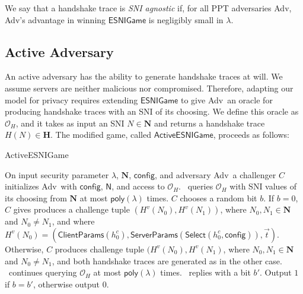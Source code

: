 \documentclass{article}
\newcommand{\adv}{{\sf Adv}}
\begin{document}
We say that a handshake trace is \emph{SNI agnostic} if, for all PPT adversaries \adv, \adv's advantage in 
winning $\mathsf{ESNIGame}$ is negligibly small in $\lambda$. 


\subsection{Active Adversary}

An active adversary has the ability to generate handshake traces at will. We assume servers are neither malicious nor compromised. 
Therefore, adapting our model for privacy requires extending $\mathsf{ESNIGame}$ to give \adv\ an oracle for producing handshake
traces with an SNI of its choosing. We define this oracle as $\mathcal{O}_H$, and it takes as input an SNI $N \in \mathbf{N}$
and returns a handshake trace $H(N) \in \mathbf{H}$. The modified game, called $\mathsf{ActiveESNIGame}$, proceeds as follows:

\begin{algorithm}
\caption{{\sf ActiveESNIGame}} 
\label{alg:active-esnigame}
\begin{algorithmic}[1]
  \STATE On input security parameter $\lambda$, $\mathbf{N}$, $\mathsf{config}$, and adversary \adv\, a challenger $C$ initializes \adv\ with $\mathsf{config}$, $\mathsf{N}$, and access to $\mathcal{O}_H$.
  \STATE \adv\ queries $\mathcal{O}_H$ with SNI values of its choosing from $\mathbf{N}$ at most $\mathsf{poly}(\lambda)$ times.
  \STATE $C$ chooses a random bit $b$. If $b = 0$, $C$ gives produces a challenge tuple $(H^v(N_0), H^v(N_1))$, where $N_0,N_1 \in \mathbf{N}$ and $N_0 \not= N_1$, and where $H^v(N_0) = (\mathsf{ClientParams}(h^c_0), \mathsf{ServerParams}(\mathsf{Select}(h^c_0, \mathsf{config})), \vec{t})$.
  Otherwise, $C$ produces challenge tuple $(H^v(N_0), H^v(N_1)$, where $N_0,N_1 \in \mathbf{N}$ and $N_0 \not= N_1$, and both handshake traces are generated as in the other case.
  \STATE \adv\ continues querying $\mathcal{O}_H$ at most $\mathsf{poly}(\lambda)$ times.
  \STATE \adv\ replies with a bit $b'$.
  \STATE Output $1$ if $b = b'$, otherwise output $0$.
\end{algorithmic}
\end{algorithm}
\end{document}
